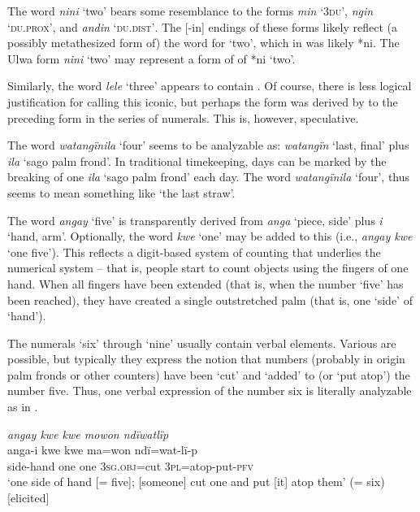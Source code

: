   The word \textit{nini} ‘two’ bears some resemblance to the  forms \textit{min} \textsc{‘3du’}, \textit{ngin} \textsc{‘du.prox’}, and \textit{andin} \textsc{‘du.dist’}. The [-in] endings of these  forms likely reflect (a possibly  metathesized form of) the word for ‘two’, which in  was likely *ni. The Ulwa form \textit{nini} ‘two’ may represent a form of   of  *ni ‘two’.

  Similarly, the word \textit{lele} ‘three’ appears to contain . Of course, there is less logical justification for calling this  iconic, but perhaps the form was derived by  to the preceding form in the series of numerals. This is, however, speculative.

  The word \textit{watangïnila} ‘four’ seems to be analyzable as: \textit{watangïn} ‘last, final’ plus \textit{ila} ‘sago palm frond’. In traditional timekeeping, days can be marked by the breaking of one \textit{ila} ‘sago palm frond’ each day. The word \textit{watangïnila} ‘four’, thus seems to mean something like ‘the last straw’.



  The word \textit{angay} ‘five’ is transparently derived from \textit{anga} ‘piece, side’ plus \textit{i} ‘hand, arm’. Optionally, the word \textit{kwe} ‘one’ may be added to this (i.e., \textit{angay kwe} ‘one five’). This reflects a  digit-based system of counting that underlies the  numerical system -- that is, people start to count objects using the fingers of one hand. When all fingers have been extended (that is, when the number ‘five’ has been reached), they have created a single outstretched palm (that is, one ‘side’ of ‘hand’).

  The numerals ‘six’ through ‘nine’ usually contain verbal elements. Various  are possible, but typically they express the notion that numbers (probably in origin palm fronds or other counters) have been ‘cut’ and ‘added’ to (or ‘put atop’) the number five. Thus, one verbal expression of the number six is literally analyzable as in .

\ea%
    \label{ex:det:215}
          \textit{angay kwe kwe mowon ndïwatlïp}\\
    \gll anga-i    kwe  kwe  ma=won    ndï=wat-lï-p\\
    side-hand  one    one    3\textsc{sg.obj}=cut  3\textsc{pl}=atop-put-\textsc{pfv}\\
\glt `one side of hand [= five]; [someone] cut one and put [it] atop them’ (= six) [elicited]
\z

